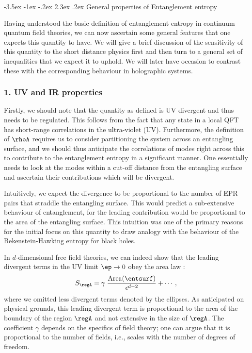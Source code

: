 \documentclass[12pt,openany]{book}
\makeatletter
\renewcommand\section{\@startsection {section}{1}{\z@}%
                                   {-3.5ex \@plus -1ex \@minus -.2ex}%
                                   {2.3ex \@plus.2ex}%
                                   {\normalfont\large\bfseries}}
\makeatother
\begin{document}
\section{General properties of Entanglement entropy}
\label{sec:genee}

Having understood the basic definition of entanglement entropy in continuum quantum field theories, we can now ascertain some general features that one expects this quantity to have. We will give a brief discussion of the sensitivity of this quantity to the short distance physics first and then turn to a general set of inequalities that we expect it to uphold. We will later have occasion to contrast these with the corresponding behaviour in holographic systems.


\subsubsection{1. UV and IR properties}
\label{sec:uvirprop}

Firstly, we should note that the quantity as defined is UV divergent and thus needs to be regulated.  This follows from the fact that any state in a local QFT has short-range correlations in the ultra-violet (UV). Furthermore, the definition of $\rhoA$ requires us to consider partitioning the system across an entangling surface, and we should thus anticipate the correlations of modes right across this to contribute to the entanglement entropy in a significant manner. One essentially needs to look at the modes within a cut-off distance from the entangling surface and ascertain their contributions which will be divergent.

Intuitively, we expect the divergence to be proportional to the number of EPR pairs that straddle the entangling surface. This would predict a sub-extensive behaviour of entanglement, for the leading contribution would be proportional to the area of the entangling surface. This intuition was one of the primary reasons for the initial focus on this quantity \cite{Bombelli:1986rw} to draw analogy with the behaviour of the Bekenstein-Hawking entropy for black holes.

In $d$-dimensional free field theories, we can indeed show that the leading divergent terms in the UV limit
$\ep\to 0$ obey the area law \cite{Srednicki:1993im,Bombelli:1986rw}:
%
\begin{equation}
S_\regA =\gamma\; \frac{\text{Area}(\entsurf)}{\epsilon^{d-2}}+\cdots ,
\label{areala}
\end{equation}
%
where we omitted less divergent terms denoted by the ellipses. As anticipated on physical grounds,  this leading divergent term is proportional to the area of the boundary of the region $\regA$ and not extensive in the size of $\regA$. The coefficient $\gamma$ depends on the specifics of field theory; one can argue that it is proportional to the number of fields, i.e., scales with the number of degrees of freedom.
\end{document}
